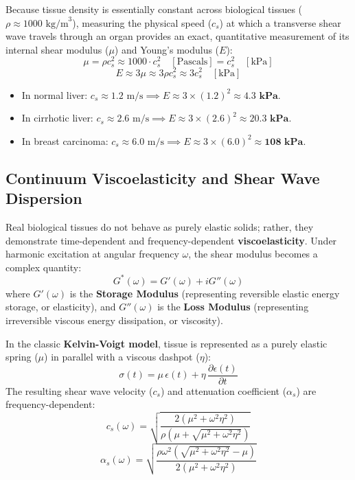 \documentclass[11pt,a4paper]{article}
\begin{document}
\begin{physicsbox}
Because tissue density is essentially constant across biological tissues ($\rho \approx 1000\text{ kg/m}^3$), measuring the physical speed ($c_s$) at which a transverse shear wave travels through an organ provides an exact, quantitative measurement of its internal shear modulus ($\mu$) and Young's modulus ($E$):
\begin{equation}
    \mu = \rho c_s^2 \approx 1000 \cdot c_s^2 \quad [\text{Pascals}] = c_s^2 \quad [\text{kPa}]
\end{equation}
\begin{equation}
    E \approx 3\mu \approx 3 \rho c_s^2 \approx 3 c_s^2 \quad [\text{kPa}]
\end{equation}
\begin{itemize}
    \item In normal liver: $c_s \approx 1.2\text{ m/s} \implies E \approx 3 \times (1.2)^2 \approx \mathbf{4.3\text{ kPa}}$.
    \item In cirrhotic liver: $c_s \approx 2.6\text{ m/s} \implies E \approx 3 \times (2.6)^2 \approx \mathbf{20.3\text{ kPa}}$.
    \item In breast carcinoma: $c_s \approx 6.0\text{ m/s} \implies E \approx 3 \times (6.0)^2 \approx \mathbf{108\text{ kPa}}$.
\end{itemize}
\end{physicsbox}

\subsection{Continuum Viscoelasticity and Shear Wave Dispersion}
Real biological tissues do not behave as purely elastic solids; rather, they demonstrate time-dependent and frequency-dependent \textbf{viscoelasticity}. Under harmonic excitation at angular frequency $\omega$, the shear modulus becomes a complex quantity:
\begin{equation}
    G^*(\omega) = G'(\omega) + i G''(\omega)
\end{equation}
where $G'(\omega)$ is the \textbf{Storage Modulus} (representing reversible elastic energy storage, or elasticity), and $G''(\omega)$ is the \textbf{Loss Modulus} (representing irreversible viscous energy dissipation, or viscosity).

In the classic \textbf{Kelvin-Voigt model}, tissue is represented as a purely elastic spring ($\mu$) in parallel with a viscous dashpot ($\eta$):
\begin{equation}
    \sigma(t) = \mu \, \epsilon(t) + \eta \, \frac{\partial \epsilon(t)}{\partial t}
\end{equation}
The resulting shear wave velocity ($c_s$) and attenuation coefficient ($\alpha_s$) are frequency-dependent:
\begin{equation}
    c_s(\omega) = \sqrt{\frac{2(\mu^2 + \omega^2 \eta^2)}{\rho (\mu + \sqrt{\mu^2 + \omega^2 \eta^2})}}
\end{equation}
\begin{equation}
    \alpha_s(\omega) = \sqrt{\frac{\rho \omega^2 (\sqrt{\mu^2 + \omega^2 \eta^2} - \mu)}{2(\mu^2 + \omega^2 \eta^2)}}
\end{equation}
\end{document}
